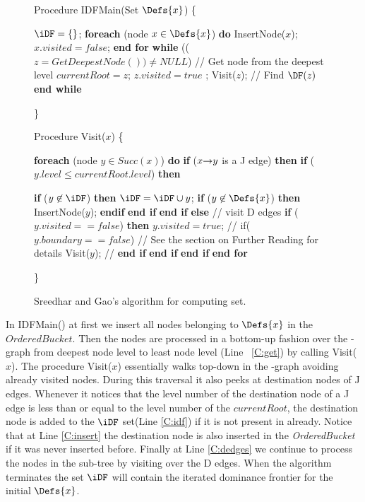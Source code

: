 {\begin{figure}[!ht]
\begin{minipage}[t]{5in}
Procedure IDFMain(Set $\Defs{x}$) 
\{
\begin{code}
 $\iDF = \{ \}$;
 {\bf foreach} (node $x \in  \Defs{x}$) {\bf do}
    InsertNode($x$);
    $x.visited = false $;
 {\bf end for}
 {\bf while} (($z = GetDeepestNode()) \neq NULL$)  \label{C:get} // Get node from the deepest level
   $currentRoot = z$;
   $z.visited = true$ ;
   Visit($z$);  // Find $\DF(z)$
 {\bf end while}
\end{code}
\} 

Procedure Visit($x$)
\{
\begin{code}
 {\bf foreach} (node $y \in  Succ(x)$) {\bf do}
  {\bf if} ($x \st{} y$ is a  J edge) {\bf then}
   {\bf if} ($y.level \leq currentRoot.level$) {\bf then}

     {\bf if} ($y \not \in \iDF$) {\bf then}
        $\iDF = \iDF \cup {y}$;   \label{C:idf}
        {\bf if} ($y \not  \in \Defs{x}$) {\bf then}
          InsertNode($y$); \label{C:insert}
        {\bf endif}
     {\bf end if}
  {\bf end if}
 {\bf else} // visit D edges 
   {\bf if} ($y.visited == false $) {\bf then}
    $y.visited = true$;
    // if($y.boundary == false$)   \label{C:cached} // See the section on Further Reading for details
     Visit($y$); \label{C:dedges}
 // {\bf end if}
   {\bf end if}
  {\bf end if}
 {\bf end for}
\end{code}
\} 
\end{minipage}
\caption{Sreedhar and Gao's algorithm for computing \iDF set.}
\label{F:IDFMain}
\end{figure}

In IDFMain() at first we insert all nodes belonging to $\Defs{x}$ in the $OrderedBucket$. Then the nodes are processed
in a bottom-up fashion over the \DJ-graph from deepest node level to least node level
(Line ~\ref{C:get}) by calling Visit($x$). The procedure Visit($x$) essentially walks top-down in the  \DJ-graph avoiding already visited nodes. During this traversal it also peeks at destination nodes of J edges. Whenever it notices that the level number of the destination node of a J edge is less than or equal to the level number of the $currentRoot$, the destination node is added to the $\iDF$ set(Line \ref{C:idf}) if it is not present in \iDF already. Notice that at Line \ref{C:insert} the destination node is also inserted in the {\it OrderedBucket} if it was never inserted before. Finally at Line \ref{C:dedges} we continue to process the nodes in the sub-tree by visiting over the D edges. When the algorithm terminates the 
set $\iDF$ will contain the iterated dominance frontier for the initial $\Defs{x}$.

}
